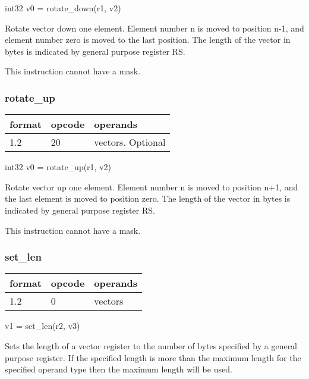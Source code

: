 \documentclass[forwardcom.tex]{subfiles}
\begin{document}
int32 v0 = rotate\_down(r1, v2)
\vspace{2mm}

Rotate vector down one element. Element number n is moved to position n-1, and element number zero is moved to the last position. The length of the vector in bytes is indicated by general purpose register RS.
\vspace{2mm}

This instruction cannot have a mask.

\subsubsection{rotate\_up}
\label{table:rotateUpInstruction}
\begin{tabular}{|p{12mm}|p{12mm}|p{110mm}|}
\hline
\bfseries format & \bfseries opcode & \bfseries operands \\ \hline
1.2 & 20 & vectors. Optional \\ \hline
\end{tabular}
\vspace{2mm}

int32 v0 = rotate\_up(r1, v2)
\vspace{2mm}

Rotate vector up one element. Element number n is moved to position n+1, and the last element is moved to position zero. The length of the vector in bytes is indicated by general purpose register RS.
\vspace{2mm}

This instruction cannot have a mask.


\subsubsection{set\_len}
\label{table:setLenInstruction}
\begin{tabular}{|p{12mm}|p{12mm}|p{110mm}|}
\hline
\bfseries format & \bfseries opcode & \bfseries operands \\ \hline
1.2 & 0 & vectors \\ \hline
\end{tabular}
\vspace{2mm}

v1 = set\_len(r2, v3)
\vspace{2mm}

Sets the length of a vector register to the number of bytes specified by a general purpose register. If the specified length is more than the maximum length for the specified operand type then the maximum length will be used.
\vspace{2mm}
\end{document}
